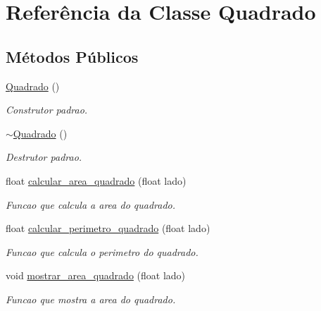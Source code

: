 \hypertarget{classQuadrado}{}\section{Referência da Classe Quadrado}
\label{classQuadrado}
\subsection*{Métodos Públicos}
\begin{DoxyCompactItemize}
\item 
\mbox{\label{classQuadrado_a8d5484ac90707904867e84beca0a390d}} 
\hyperlink{classQuadrado_a8d5484ac90707904867e84beca0a390d}{Quadrado} ()
\begin{DoxyCompactList}\small\item\em Construtor padrao. \end{DoxyCompactList}\item 
\mbox{\label{classQuadrado_ae3f2e0aad221923909523240b2d76390}} 
\hyperlink{classQuadrado_ae3f2e0aad221923909523240b2d76390}{$\sim$\+Quadrado} ()
\begin{DoxyCompactList}\small\item\em Destrutor padrao. \end{DoxyCompactList}\item 
float \hyperlink{classQuadrado_ac9a1b2cbb7c64216548df116ec7c2d3a}{calcular\+\_\+area\+\_\+quadrado} (float lado)
\begin{DoxyCompactList}\small\item\em Funcao que calcula a area do quadrado. \end{DoxyCompactList}\item 
float \hyperlink{classQuadrado_ae6dd8e8a8103c7b144fade9b2c4b87d4}{calcular\+\_\+perimetro\+\_\+quadrado} (float lado)
\begin{DoxyCompactList}\small\item\em Funcao que calcula o perimetro do quadrado. \end{DoxyCompactList}\item 
void \hyperlink{classQuadrado_a4e4c451229d5baf10ba952248d944eaa}{mostrar\+\_\+area\+\_\+quadrado} (float lado)
\begin{DoxyCompactList}\small\item\em Funcao que mostra a area do quadrado. \end{DoxyCompactList}\item 

\end{DoxyCompactItemize}
